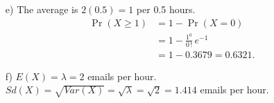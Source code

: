 \documentclass[12pt]{article}
\begin{document}
{\begin{minipage}[t]{0.98\textwidth}
\begin{minipage}[t]{0.47\textwidth}
\begin{enumerate}[a)]
\begin{align*}
&= 1 - \left(\frac{4^0}{0\,!} \,e^{-4} + \frac{4^1}{1\,!} \,e^{-4} + \frac{4^2}{2\,!} \,e^{-4} + \right. \\
& \qquad\qquad\qquad\qquad\qquad\left.\frac{4^3}{3\,!} \,e^{-4} + \frac{4^4}{4\,!} \,e^{-4}\right) \\[0.2cm]
&= 1 - (0.0183 + 0.0733 + 0.1465 + \\
&\qquad\qquad\qquad\qquad\qquad0.1954 + 0.1954)\\[0.1cm]
&= 1-0.6289=0.3711.
\end{align*}
\item[e)] The average is $2(0.5) = 1$ per 0.5 hours. \quad\\[-0.5cm]
\begin{align*}
\Pr(X\ge1) &= 1 - \Pr(X = 0) \\[0.2cm]
&= 1 - \frac{1^0}{0\,!} \,e^{-1}\\[0.2cm]
&= 1 - 0.3679 = 0.6321.
\end{align*}
\item[f)] $E(X) = \lambda = 2$ emails per hour.\\[0.4cm]
$Sd(X) = \sqrt{Var(X)} = \sqrt{\lambda} = \sqrt{2} = 1.414$ emails per hour.
\end{enumerate}
\end{minipage}
\end{minipage}}\vspace{0.03\textwidth}
\end{document}
